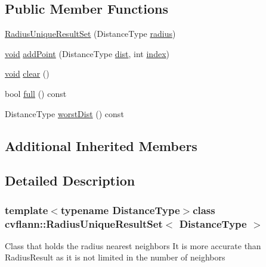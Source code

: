 \subsection*{Public Member Functions}
\begin{DoxyCompactItemize}
\item 
\hyperlink{classcvflann_1_1RadiusUniqueResultSet_a21f0ac724ab27c3b856ad8c2642c3634}{Radius\-Unique\-Result\-Set} (Distance\-Type \hyperlink{imgproc__c_8h_a32526d67e420fc7060ade2efeaeda976}{radius})
\item 
\hyperlink{legacy_8hpp_a8bb47f092d473522721002c86c13b94e}{void} \hyperlink{classcvflann_1_1RadiusUniqueResultSet_a41fcdc5b25ee294094814b98548e4374}{add\-Point} (Distance\-Type \hyperlink{legacy_8hpp_ae895c2003a87eda49126845b7ac3688e}{dist}, int \hyperlink{core__c_8h_a750b5d744c39a06bfb13e6eb010e35d0}{index})
\item 
\hyperlink{legacy_8hpp_a8bb47f092d473522721002c86c13b94e}{void} \hyperlink{classcvflann_1_1RadiusUniqueResultSet_ae9b39884adddbb060d6661ec4e7c0b0d}{clear} ()
\item 
bool \hyperlink{classcvflann_1_1RadiusUniqueResultSet_a74a655e91b339927b458609a1d4e1eb4}{full} () const 
\item 
Distance\-Type \hyperlink{classcvflann_1_1RadiusUniqueResultSet_a07cc3d2c8825a1ff9c56b6d050fc4c50}{worst\-Dist} () const 
\end{DoxyCompactItemize}
\subsection*{Additional Inherited Members}


\subsection{Detailed Description}
\subsubsection*{template$<$typename Distance\-Type$>$class cvflann\-::\-Radius\-Unique\-Result\-Set$<$ Distance\-Type $>$}

Class that holds the radius nearest neighbors It is more accurate than Radius\-Result as it is not limited in the number of neighbors 

